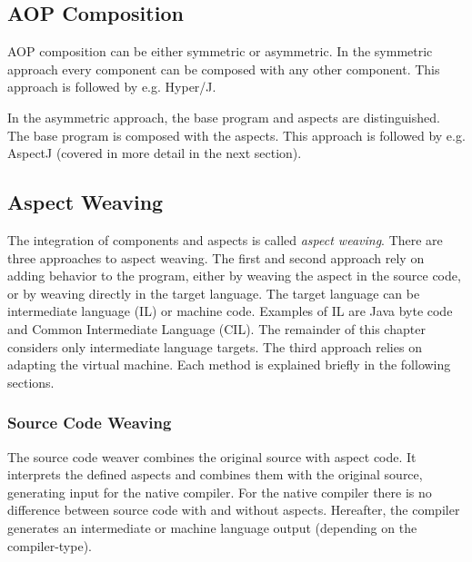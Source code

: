 \subsection{AOP Composition}
\label{sec:AOPComposition}

AOP composition can be either symmetric or asymmetric.
In the symmetric approach every component can be composed with any other component.
This approach is followed by e.g. Hyper/J.

In the asymmetric approach, the base program and aspects are distinguished.
The base program is composed with the aspects.
This approach is followed by e.g. AspectJ (covered in more detail in the next section).

\subsection{Aspect Weaving}
\label{sec:AspectWeaving}

%
%
The integration of components and aspects is called \emph{aspect weaving}.
There are three approaches to aspect weaving.
The first and second approach rely on adding behavior to the program, either by weaving the aspect in the source code, or by weaving directly in the target language.
The target language can be intermediate language (IL) or machine code.
Examples of IL are Java byte code and Common Intermediate Language (CIL).
The remainder of this chapter considers only intermediate language targets.
The third approach relies on adapting the virtual machine.
Each method is explained briefly in the following sections.

\subsubsection{Source Code Weaving}
\label{sec:source_code_weaving}

The source code weaver combines the original source with aspect code.
It interprets the defined aspects and combines them with the original source, generating input for the native compiler.
For the native compiler there is no difference between source code with and without aspects.
Hereafter, the compiler generates an intermediate or machine language output (depending on the compiler-type).

